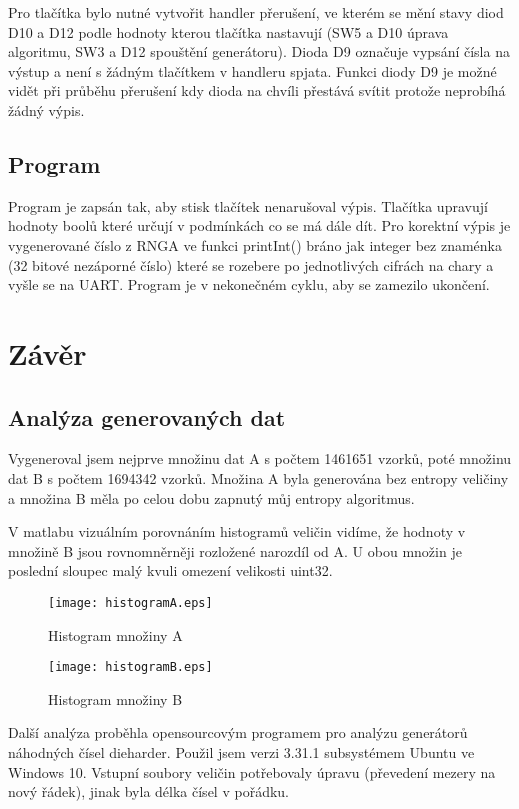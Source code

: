 \documentclass[a4paper]{article}
\begin{document}
\noindent Pro tlačítka bylo nutné vytvořit handler přerušení, ve kterém se mění stavy diod D10 a D12 podle hodnoty kterou tlačítka nastavují (SW5 a D10 úprava algoritmu, SW3 a D12 spouštění generátoru). Dioda D9 označuje vypsání čísla na výstup a není s žádným tlačítkem v handleru spjata. Funkci diody D9 je možné vidět při průběhu přerušení kdy dioda na chvíli přestává svítit protože neprobíhá žádný výpis.

\subsection{Program}
Program je zapsán tak, aby stisk tlačítek nenarušoval výpis. Tlačítka upravují hodnoty boolů které určují v podmínkách co se má dále dít. Pro korektní výpis je vygenerované číslo z RNGA ve funkci printInt() bráno jak integer bez znaménka (32 bitové nezáporné číslo) které se rozebere po jednotlivých cifrách na chary a vyšle se na UART. Program je v nekonečném cyklu, aby se zamezilo ukončení.

\section{Závěr}
\subsection{Analýza generovaných dat}
Vygeneroval jsem nejprve množinu dat A s počtem 1461651 vzorků, poté množinu dat B s počtem 1694342 vzorků. Množina A byla generována bez entropy veličiny a množina B měla po celou dobu zapnutý můj entropy algoritmus.

\noindent V matlabu vizuálním porovnáním histogramů veličin vidíme, že hodnoty v množině B jsou rovnomněrněji rozložené narozdíl od A. U obou množin je poslední sloupec malý kvuli omezení velikosti uint32.

\begin{figure}[#1]
  \centerline{\texttt{[image: histogramA.eps]}}
  \caption[HistogramA]{Histogram množiny A}
\end{figure}
\begin{figure}[#2]
  \centerline{\texttt{[image: histogramB.eps]}}
  \caption[HistogramB]{Histogram množiny B}
\end{figure}
\clearpage
\noindent Další analýza proběhla opensourcovým programem pro analýzu generátorů náhodných čísel dieharder. Použil jsem verzi 3.31.1 subsystémem Ubuntu ve Windows 10. Vstupní soubory veličin potřebovaly úpravu (převedení mezery na nový řádek), jinak byla délka čísel v pořádku.
\end{document}
